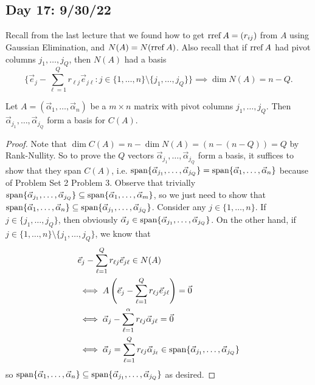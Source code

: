 \documentclass[main.tex]{subfiles}
\begin{document}
\subsection{Day 17: 9/30/22}
Recall from the last lecture that we found how to get $\operatorname{rref} A = (r_{ij})$ from $A$ using Gaussian Elimination, and $N(A) = N(\operatorname{rref} A)$. Also recall that if $\operatorname{rref} A$ had pivot columns $j_1, \ldots , j_Q$, then $N(A)$ had a basis 
\[\{\vec{e}_j - \sum_{\ell = 1}^Qr_{\ell j}\vec{e}_{j\ell}: j\in \{1, \ldots , n\}\setminus \{j_1, \ldots , j_Q\}\}\implies \dim N(A) = n - Q.\]

\begin{proposition}
    Let $A = (\vec{\alpha}_1, \ldots , \vec{\alpha}_n)$ be a $m\times n$ matrix with pivot columns $j_1, \ldots , j_Q$. Then $\vec{\alpha}_{j_1}, \ldots , \vec{\alpha}_{j_Q}$ form a basis for $C(A)$.
\end{proposition}

\begin{proof}
    Note that $\dim C(A) = n - \dim N(A) = (n - (n - Q)) = Q$ by Rank-Nullity. So to prove the $Q$ vectors $\vec{\alpha}_{j_1}, \ldots , \vec{\alpha}_{j_Q}$ form a basis, it suffices to show that they span $C(A)$, i.e. $\operatorname{span}\{\vec{\alpha}_{j_1}, \ldots , \vec{\alpha}_{j_Q}\} = \operatorname{span}\{\vec{\alpha}_{1}, \ldots , \vec{\alpha}_{n}\}$ because of Problem Set 2 Problem 3. Observe that trivially $\operatorname{span}\{\vec{\alpha}_{j_1}, \ldots , \vec{\alpha}_{j_Q}\} \subseteq \operatorname{span}\{\vec{\alpha}_{1}, \ldots , \vec{\alpha}_{m}\}$, so we just need to show that $ \operatorname{span}\{\vec{\alpha}_{1}, \ldots , \vec{\alpha}_{n}\}\subseteq \operatorname{span}\{\vec{\alpha}_{j_1}, \ldots , \vec{\alpha}_{j_Q}\}$. Consider any $j \in \{1, \ldots , n\}$. If $j\in \{j_1, \ldots , j_Q\}$, then obviously $\vec{\alpha}_j\in \operatorname{span}\{\vec{\alpha}_{j_1}, \ldots , \vec{\alpha}_{j_Q}\}$. On the other hand, if $j \in \{1, \ldots , n\}\setminus \{j_1, \ldots , j_Q\}$, we know that 
    \begin{align*}
        &\vec{e}_j - \sum_{\ell = 1}^Qr_{\ell j}\vec{e}_{j\ell}\in N(A) \\
        &\iff A\left(\vec{e}_j - \sum_{\ell = 1}^Qr_{\ell j}\vec{e}_{j\ell}\right) = \vec{0} \\
        &\iff \vec{\alpha}_j - \sum_{\ell = 1}^\alpha r_{\ell j}\vec{\alpha}_{j\ell} = \vec{0} \\
        &\iff \vec{\alpha}_j = \sum_{\ell = 1}^Q r_{\ell j}\vec{\alpha}_{j_\ell}\in \operatorname{span}\{\vec{\alpha}_{j_1}, \ldots , \vec{\alpha}_{j_Q}\}
    \end{align*}
    so $\operatorname{span}\{\vec{\alpha}_{1}, \ldots , \vec{\alpha}_{n}\}\subseteq \operatorname{span}\{\vec{\alpha}_{j_1}, \ldots , \vec{\alpha}_{j_Q}\}$ as desired.
\end{proof}
\end{document}
